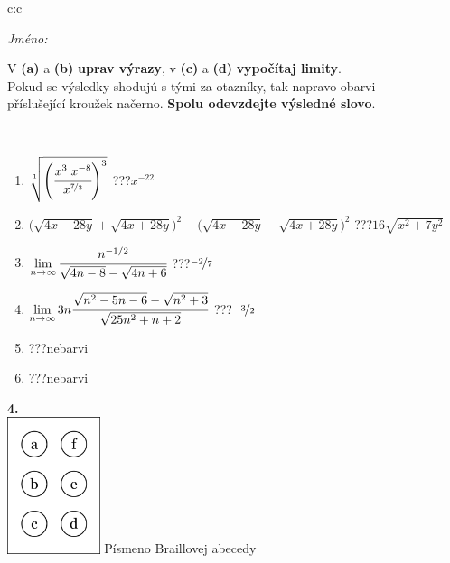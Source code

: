 \documentclass[10pt]{report}
\begin{document}
\begin{tabular}{c:c}
\begin{minipage}[c][104.5mm][t]{0.5\linewidth}
\begin{center}
\textit{Jméno:}\phantom{xxxxxxxxxxxxxxxxxxxxxxxxxxxxxxxxxxxxxxxxxxxxxxxxxxxxxxxxxxxxxxxxx}\\[5mm]
\begin{minipage}{0.95\linewidth}
\begin{center}
V \textbf{(a)} a \textbf{(b)} \textbf{uprav výrazy}, v \textbf{(c)} a \textbf{(d)} \textbf{vypočítaj limity}.\\Pokud se výsledky shodujú s tými za otazníky, tak napravo obarvi\\příslušející kroužek načerno. \textbf{Spolu odevzdejte výsledné slovo}.
\end{center}
\end{minipage}
\\[1mm]
\begin{minipage}{0.79\linewidth}
\begin{center}
\begin{varwidth}{\linewidth}
\begin{enumerate}
\small
\item $\sqrt[1]{\left(\cfrac{x^{3}\;x^{-8}}{x^{\nicefrac{7}{3}}}\right)^{3}}$\quad \dotfill\; ???\;\dotfill \quad $x^{-22}$
\item {\footnotesize{\scriptsize$\big(\sqrt{4x-28y}+\sqrt{4x+28y}\big)^2-\big(\sqrt{4x-28y}-\sqrt{4x+28y}\big)^2$}\quad \dotfill\; ???\;\dotfill \quad $16\sqrt{x^2+7y^2}$}
\item $\lim\limits_{n\to\infty}\cfrac{n^{-1/2}}{\sqrt{4n-8}-\sqrt{4n+6}}$\quad \dotfill\; ???\;\dotfill \quad $\nicefrac{-2}{7}$
\item $\lim\limits_{n\to\infty}3n\cfrac{\sqrt{n^2-5n-6}-\sqrt{n^2+3}}{\sqrt{25n^2+n+2}}$\quad \dotfill\; ???\;\dotfill \quad $\nicefrac{-3}{2}$
\item \quad \dotfill\; ???\;\dotfill \quad nebarvi
\item \quad \dotfill\; ???\;\dotfill \quad nebarvi
\end{enumerate}
\end{varwidth}
\end{center}
\end{minipage}
\begin{minipage}{0.20\linewidth}
\begin{center}
{\Huge\bfseries 4.} \\[2mm]
\includegraphics[height=40mm]{../images/braille.png}
{\small Písmeno Braillovej abecedy}
\end{center}
\end{minipage}
\end{center}
\end{minipage}
%
\end{tabular}
\end{document}
